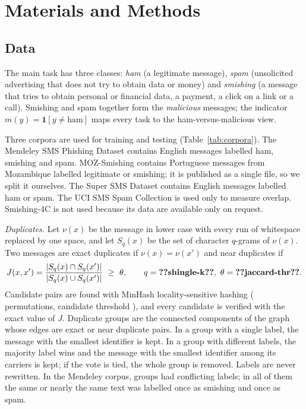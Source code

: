 \section{Materials and Methods}\label{sec:methods}

\subsection{Data}\label{sec:data}

The main task has three classes: \emph{ham} (a legitimate message), \emph{spam} (unsolicited advertising that does not try to obtain data or money) and \emph{smishing} (a message that tries to obtain personal or financial data, a payment, a click on a link or a call). Smishing and spam together form the \emph{malicious} messages; the indicator $m(y)=\mathbf{1}[y\neq\text{ham}]$ maps every task to the ham-versus-malicious view.

Three corpora are used for training and testing (Table~\ref{tab:corpora}). The Mendeley SMS Phishing Dataset \cite{mendeley2022,mishra2023dataset} contains English messages labelled ham, smishing and spam. MOZ-Smishing \cite{moz2025} contains Portuguese messages from Mozambique labelled legitimate or smishing; it is published as a single file, so we split it ourselves. The Super SMS Dataset \cite{salman2024} contains English messages labelled ham or spam. The UCI SMS Spam Collection \cite{almeida2011} is used only to measure overlap. Smishing-4C \cite{smishing4c2024} is not used because its data are available only on request.

\emph{Duplicates.} Let $\nu(x)$ be the message in lower case with every run of whitespace replaced by one space, and let $S_q(x)$ be the set of character $q$-grams of $\nu(x)$. Two messages are exact duplicates if $\nu(x)=\nu(x')$ and near duplicates if
\begin{equation}\label{eq:jaccard}
J(x,x')=\frac{|S_q(x)\cap S_q(x')|}{|S_q(x)\cup S_q(x')|}\ \ge\ \theta,\qquad q=\val{shingle-k},\ \theta=\val{jaccard-thr}.
\end{equation}
Candidate pairs are found with MinHash locality-sensitive hashing \cite{broder1997} ( permutations, candidate threshold ), and every candidate is verified with the exact value of $J$. Duplicate groups are the connected components of the graph whose edges are exact or near duplicate pairs. In a group with a single label, the message with the smallest identifier is kept. In a group with different labels, the majority label wins and the message with the smallest identifier among its carriers is kept; if the vote is tied, the whole group is removed. Labels are never rewritten. In the Mendeley corpus,  groups had conflicting labels; in all of them the same or nearly the same text was labelled once as smishing and once as spam.


